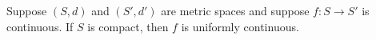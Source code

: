 Suppose $(S, d)$ and $(S', d')$ are metric spaces and suppose $f: S \to S'$ is continuous. If $S$ is compact, then $f$ is uniformly continuous.
